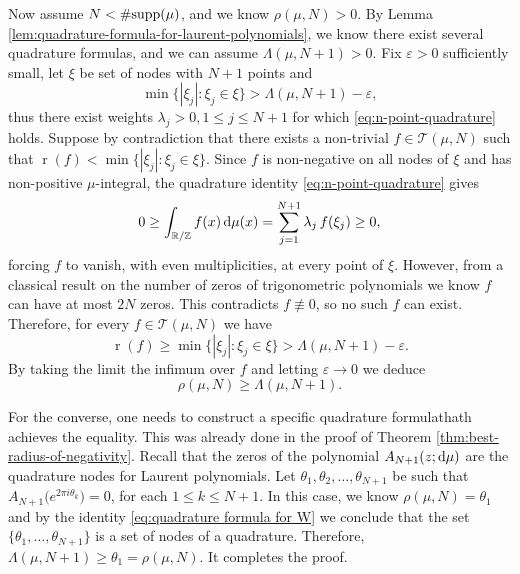\documentclass[reqno, a4paper]{amsart}
\def\T{\mathbb{R}/\mathbb{Z}}
\def\supp{{\rm supp}}
\renewcommand{\d}{\text{\rm d}}
\renewcommand{\epsilon}{\varepsilon} %
\renewcommand{\r}{\operatorname{r}}
\theoremstyle{plain}
\theoremstyle{definition}
\theoremstyle{remarkstyle}
\numberwithin{equation}{section}
\begin{document}
Now assume $N<\#\supp(\mu)$, and we know $\rho(\mu, N)>0$. By Lemma \ref{lem:quadrature-formula-for-laurent-polynomials}, we know there exist several quadrature formulas, and we can assume $\Lambda(\mu, N+1)>0$. 
Fix $\epsilon>0$ sufficiently small, let $\xi$ be set of nodes with $N+1$ points and 
\begin{equation*}
    \min\bigl\{|\xi_j| : \xi_j \in \xi \bigr\}>\Lambda(\mu, N+1)-\epsilon,
\end{equation*}
thus there exist weights $\lambda_j>0, 1\leq j\leq N+1$ for which \eqref{eq:n-point-quadrature} holds. Suppose by contradiction that there exists a non-trivial $f \in \mathcal{T}(\mu, N)$ such that
$\r(f) < \min\{|\xi_j| : \xi_j \in \xi\}$.
Since $f$ is non-negative on all nodes of $\xi$ and has non-positive $\mu$-integral, the quadrature identity \eqref{eq:n-point-quadrature} gives
\begin{equation*}
    0 \geq \int_{\T} f(x)\,\d\mu(x)
    = \sum_{j=1}^{N+1} \lambda_j\,f(\xi_j) \geq 0,
\end{equation*}
forcing $f$ to vanish, with even multiplicities, at every point of $\xi$. However, from a classical result on the number of zeros of trigonometric polynomials \cite[Chapter X, Theorem 1.7]{ZygmundTrigonometricSeries} we know $f$ can have at most $2N$ zeros. This contradicts $f \not\equiv 0$, so no such $f$ can exist. Therefore, for every $f\in \mathcal{T}(\mu, N)$ we have 
\begin{equation*}
    \r(f)\geq \min\{|\xi_j| : \xi_j \in \xi\}>\Lambda(\mu, N+1)-\varepsilon.    
\end{equation*}
By taking the limit the infimum over $f$ and letting $\varepsilon\to 0$ we deduce
\begin{equation*}
    \rho(\mu, N) \geq \Lambda(\mu, N+1).
\end{equation*}

\smallskip

For the converse, one needs to construct a specific quadrature formulathath achieves the equality. This was already done in the proof of Theorem \ref{thm:best-radius-of-negativity}. Recall that the zeros of the polynomial $A_{N+1}(z;\d\mu)$ are the quadrature nodes for Laurent polynomials. Let $\theta_1, \theta_2, \ldots, \theta_{N+1}$ be such that $A_{N+1}\bigl(e^{2\pi i \theta_k}\bigr)=0$, for each $1\leq k\leq N+1$.
In this case, we know $\rho(\mu, N)=\theta_1$ and by the identity \eqref{eq:quadrature formula for W} we conclude that the set $\{\theta_1, \ldots, \theta_{N+1}\}$ is a set of nodes of a quadrature. Therefore, $\Lambda(\mu, N+1)\geq \theta_1=\rho(\mu, N)$. It completes the proof. 
\end{document}
